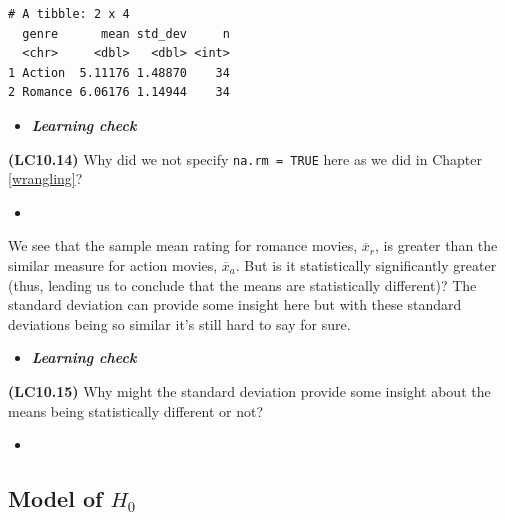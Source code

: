 \documentclass[12pt, krantz2,]{krantz}
\makeatletter
\newenvironment{Shaded}{\begin{snugshade}}{\end{snugshade}}
\newcommand{\DataTypeTok}[1]{\textcolor[rgb]{0.27,0.27,0.27}{#1}}
\newcommand{\KeywordTok}[1]{\textcolor[rgb]{0.27,0.27,0.27}{\textbf{#1}}}
\newcommand{\NormalTok}[1]{#1}
\newcommand{\OperatorTok}[1]{\textcolor[rgb]{0.43,0.43,0.43}{\textbf{#1}}}
\newcommand{\StringTok}[1]{\textcolor[rgb]{0.5,0.5,0.5}{#1}}
\newenvironment{kframe}{%
\medskip{}
\setlength{\fboxsep}{.8em}
 \def\at@end@of@kframe{}%
 \ifinner\ifhmode%
  \def\at@end@of@kframe{\end{minipage}}%
  \begin{minipage}{\columnwidth}%
 \fi\fi%
 \def\FrameCommand##1{\hskip\@totalleftmargin \hskip-\fboxsep
 \colorbox{shadecolor}{##1}\hskip-\fboxsep
     \hskip-\linewidth \hskip-\@totalleftmargin \hskip\columnwidth}%
 \MakeFramed {\advance\hsize-\width
   \@totalleftmargin\z@ \linewidth\hsize
   \@setminipage}}%
 {\par\unskip\endMakeFramed%
 \at@end@of@kframe}
\renewenvironment{Shaded}{\begin{kframe}}{\end{kframe}}
\newenvironment{rmdblock}[1]
  {\begin{shaded*}
  \begin{itemize}
  \renewcommand{\labelitemi}{
    \raisebox{-.7\height}[0pt][0pt]{
    }
  }
  \item
  }
  {
  \end{itemize}
  \end{shaded*}
  }
\newenvironment{learncheck}
  {\begin{rmdblock}{warning}}
  {\end{rmdblock}}
\makeatother
\begin{document}
\begin{Shaded}
\end{Shaded}

\begin{verbatim}
# A tibble: 2 x 4
  genre      mean std_dev     n
  <chr>     <dbl>   <dbl> <int>
1 Action  5.11176 1.48870    34
2 Romance 6.06176 1.14944    34
\end{verbatim}

\begin{learncheck}
\textbf{\emph{Learning check}}
\end{learncheck}

\textbf{(LC10.14)} Why did we not specify \texttt{na.rm\ =\ TRUE} here as we did in Chapter \ref{wrangling}?

\begin{learncheck}

\end{learncheck}

We see that the sample mean rating for romance movies, \(\overline{x}_{r}\), is greater than the similar measure for action movies, \(\overline{x}_a\). But is it statistically significantly greater (thus, leading us to conclude that the means are statistically different)? The standard deviation can provide some insight here but with these standard deviations being so similar it's still hard to say for sure.

\begin{learncheck}
\textbf{\emph{Learning check}}
\end{learncheck}

\textbf{(LC10.15)} Why might the standard deviation provide some insight about the means being statistically different or not?

\begin{learncheck}

\end{learncheck}

\hypertarget{model-of-h_0}{%
\subsection{\texorpdfstring{Model of \(H_0\)}{Model of H\_0}}\label{model-of-h_0}}
\end{document}
